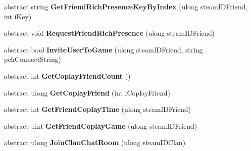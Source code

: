 \begin{DoxyCompactItemize}
\item 
\mbox{\label{class_valve_1_1_steamworks_1_1_i_steam_friends_a920257b4a8b6bf491764ed2d1e2ec78d}} 
abstract string {\bfseries Get\+Friend\+Rich\+Presence\+Key\+By\+Index} (ulong steam\+I\+D\+Friend, int i\+Key)
\item 
\mbox{\label{class_valve_1_1_steamworks_1_1_i_steam_friends_a5dd172723bf20cbfdab5625eb1944301}} 
abstract void {\bfseries Request\+Friend\+Rich\+Presence} (ulong steam\+I\+D\+Friend)
\item 
\mbox{\label{class_valve_1_1_steamworks_1_1_i_steam_friends_a979cb878d5a52b93ad2a16cd72107bf6}} 
abstract bool {\bfseries Invite\+User\+To\+Game} (ulong steam\+I\+D\+Friend, string pch\+Connect\+String)
\item 
\mbox{\label{class_valve_1_1_steamworks_1_1_i_steam_friends_a6004d9661482ba31f2f216354282345b}} 
abstract int {\bfseries Get\+Coplay\+Friend\+Count} ()
\item 
\mbox{\label{class_valve_1_1_steamworks_1_1_i_steam_friends_a4f805b01e395df3f3a2b5020bf1be4dc}} 
abstract ulong {\bfseries Get\+Coplay\+Friend} (int i\+Coplay\+Friend)
\item 
\mbox{\label{class_valve_1_1_steamworks_1_1_i_steam_friends_af2b9178eb022261dc627c498cea97560}} 
abstract int {\bfseries Get\+Friend\+Coplay\+Time} (ulong steam\+I\+D\+Friend)
\item 
\mbox{\label{class_valve_1_1_steamworks_1_1_i_steam_friends_aa8ff7cc8b9bebf87b1858161458f68a0}} 
abstract uint {\bfseries Get\+Friend\+Coplay\+Game} (ulong steam\+I\+D\+Friend)
\item 
\mbox{\label{class_valve_1_1_steamworks_1_1_i_steam_friends_a5b32757d0a60d02e611a25dd4111e8e1}} 
abstract ulong {\bfseries Join\+Clan\+Chat\+Room} (ulong steam\+I\+D\+Clan)
\item 

\end{DoxyCompactItemize}
